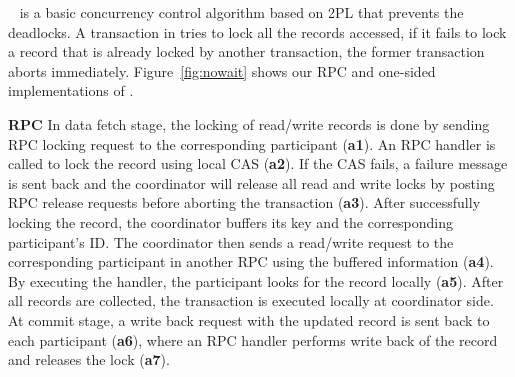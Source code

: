  
\nowait~\cite{Bernstein:1981:CCD:356842.356846} is a basic concurrency control algorithm 
based on 2PL that prevents the deadlocks. 
A transaction in \nowait tries to lock all the records accessed, if it fails to lock a record that is already locked by another transaction, 
the former transaction aborts immediately.
Figure~\ref{fig:nowait} shows our RPC and one-sided implementations of \nowait. 

{\bf RPC}
In data fetch stage, the locking of read/write
 records is done by sending RPC locking request
to the corresponding participant (\step \textbf{a1}).
An RPC handler is called to lock the record using local CAS (\step \textbf{a2}). If the CAS fails, a failure message is sent back and the coordinator will release all read and write
locks by posting RPC release requests before aborting the transaction (\step \textbf{a3}).
After successfully locking the record, the coordinator buffers its key and the corresponding participant's ID. The coordinator then sends a read/write 
request to the corresponding participant in another RPC 
using the buffered information (\step \textbf{a4}). By executing the handler, the participant looks for the record locally (\step \textbf{a5}). After all records are collected, the transaction is executed locally at coordinator side.
At commit stage, 
a write back request with the updated record 
is sent back to each participant (\step \textbf{a6}), where an RPC handler 
performs write back of the record and releases the lock (\step \textbf{a7}).

